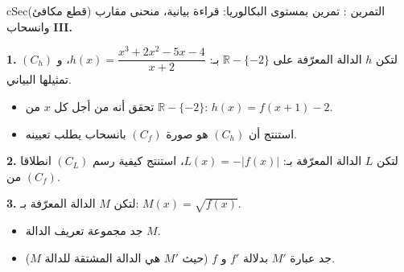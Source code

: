 \documentclass[12pt,a4paper]{article}
\newenvironment{BOX}[2]{\begin{otherlanguage}{english}\begin{arbox}{#1}{#2}}{\end{arbox}\end{otherlanguage}}
\newcounter{exo}
\newenvironment{tamrin}[1]{\stepcounter{exo}\begin{BOX}{cSec}{التمرين \theexo: #1}}{\end{BOX}}
\newcommand{\R}{\mathbb{R}}
\newcommand{\QQ}[1]{\par\smallskip\textbf{#1.} }
\begin{document}
\begin{tamrin}{تمرين بمستوى البكالوريا: قراءة بيانية، منحنى مقارب (قطع مكافئ) وانسحاب}
\textbf{III.}
\QQ{1} لتكن $h$ الدالة المعرّفة على $\R-\{-2\}$ بـ: $h(x)=\dfrac{x^{3}+2x^{2}-5x-4}{x+2}$، و $(C_h)$ تمثيلها البياني.
\begin{itemize}[label=\textcircled{\scriptsize S}]
\item تحقق أنه من أجل كل $x$ من $\R-\{-2\}$: $h(x)=f(x+1)-2$.
\item استنتج أن $(C_h)$ هو صورة $(C_f)$ بانسحاب يطلب تعيينه.
\end{itemize}
\QQ{2} لتكن $L$ الدالة المعرّفة بـ: $L(x)=-|f(x)|$، استنتج كيفية رسم $(C_L)$ انطلاقا من $(C_f)$.
\QQ{3} لتكن $M$ الدالة المعرّفة بـ: $M(x)=\sqrt{f(x)}$.
\begin{itemize}[label=\textcircled{\scriptsize S}]
\item جد مجموعة تعريف الدالة $M$.
\item جد عبارة $M'$ بدلالة $f'$ و $f$ (حيث $M'$ هي الدالة المشتقة للدالة $M$).
\end{itemize}
\end{tamrin}
\end{document}

